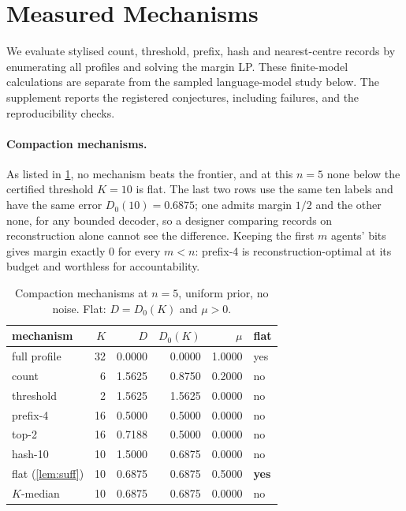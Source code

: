 \documentclass[sigconf,anonymous,acmthm=false]{aamas}
\theoremstyle{acmplain}
\theoremstyle{acmdefinition}
\begin{document}
\section{Measured Mechanisms}\label{sec:experiments}

We evaluate stylised count, threshold, prefix, hash and nearest-centre records by enumerating
all profiles and solving the margin LP. These finite-model calculations are separate from
the sampled language-model study below. The supplement reports the registered conjectures,
including failures, and the reproducibility checks.

\paragraph{Compaction mechanisms.} As listed in \cref{tab:mech}, no mechanism beats the
frontier, and at this $n=5$ none below the certified threshold $K=10$ is flat. The last two rows use the same ten labels
and have the same error $D_0(10)=0.6875$; one admits margin $1/2$ and the other none, for any
bounded decoder, so a designer comparing records on reconstruction alone cannot see the
difference. Keeping the first $m$ agents' bits gives margin exactly 0 for every $m<n$: prefix-4
is reconstruction-optimal at its budget and worthless for accountability.

\begin{table}[t]
\caption{Compaction mechanisms at $n=5$, uniform prior, no noise. Flat: $D=D_0(K)$ and $\mu>0$.}
\label{tab:mech}
\footnotesize
\begin{tabular}{@{}lrrrrl@{}}
\toprule
mechanism & $K$ & $D$ & $D_0(K)$ & $\mu$ & flat\\
\midrule
full profile & 32 & 0.0000 & 0.0000 & 1.0000 & yes\\
count & 6 & 1.5625 & 0.8750 & 0.2000 & no\\
threshold & 2 & 1.5625 & 1.5625 & 0.0000 & no\\
prefix-4 & 16 & 0.5000 & 0.5000 & 0.0000 & no\\
top-2 & 16 & 0.7188 & 0.5000 & 0.0000 & no\\
hash-10 & 10 & 1.5000 & 0.6875 & 0.0000 & no\\
\midrule
flat (\cref{lem:suff}) & 10 & 0.6875 & 0.6875 & 0.5000 & \textbf{yes}\\
$K$-median & 10 & 0.6875 & 0.6875 & 0.0000 & no\\
\bottomrule
\end{tabular}
\end{table}
\end{document}
